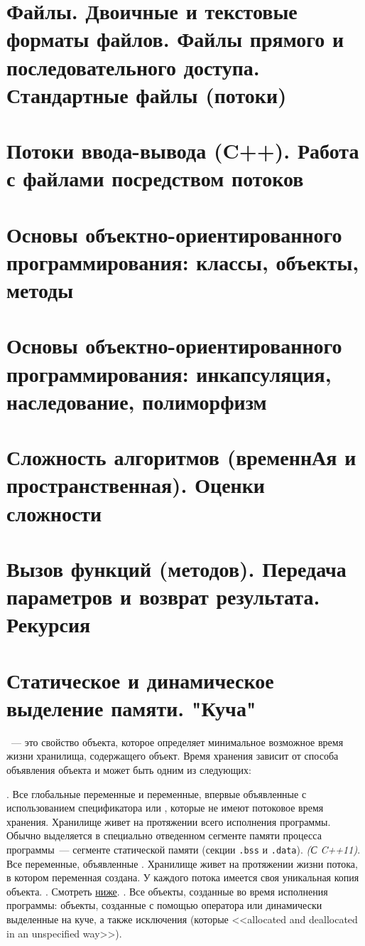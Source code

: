 \section{Файлы. Двоичные и текстовые форматы файлов. Файлы прямого и последовательного доступа. Стандартные файлы (потоки)}
\section{Потоки ввода-вывода (C++). Работа с файлами посредством потоков}
\section{Основы объектно-ориентированного программирования: классы, объекты, методы}
\section{Основы объектно-ориентированного программирования: инкапсуляция, наследование, полиморфизм}
\section{Сложность алгоритмов (временнАя и пространственная). Оценки сложности}
\section{Вызов функций (методов). Передача параметров и возврат результата. Рекурсия}
\section{Статическое и динамическое выделение памяти. "Куча"}
~--- это свойство объекта, которое определяет минимальное
возможное время жизни хранилища, содержащего объект.
Время хранения зависит от способа объявления объекта и может быть одним из следующих:

\begin{itemize}
  . Все глобальные переменные и переменные, впервые объявленные с использованием
  спецификатора  или , которые не имеют потоковое время хранения.
  Хранилище живет на протяжении всего исполнения программы. Обычно выделяется в специально отведенном сегменте
  памяти процесса программы~--- сегменте статической памяти (секции \verb|.bss| и \verb|.data|).
   {\small\textit{(С C++11)}}. Все переменные, объявленные .
  Хранилище живет на протяжении жизни потока, в котором переменная создана. У каждого потока имеется
  своя уникальная копия объекта.
  . Смотреть \hyperref[def:auto_storage]{ниже}.
  . Все объекты, созданные во время исполнения программы:
  объекты, созданные с помощью оператора  или динамически выделенные на куче,
  а также исключения (которые <<allocated and deallocated in an unspecified way>>).
\end{itemize}

